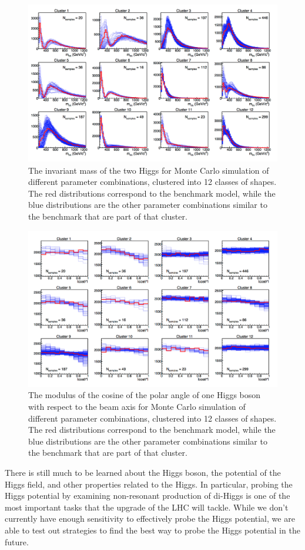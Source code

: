 \begin{figure}[h]
\centering
\includegraphics[scale=0.4]{F2/MHHClusters.png}
\caption{The invariant mass of the two Higgs for Monte Carlo simulation of different parameter combinations, clustered into 12 classes of shapes. The red distributions correspond to the benchmark model, while the blue distributions are the other parameter combinations similar to the benchmark that are part of that cluster.}
\label{Fig:MHHClusters}
\end{figure}

\begin{figure}[h]
\centering
\includegraphics[scale=0.4]{F2/CosClusters.png}
\caption{The modulus of the cosine of the polar angle of one Higgs boson with respect to the beam axis for Monte Carlo simulation of different parameter combinations, clustered into 12 classes of shapes. The red distributions correspond to the benchmark model, while the blue distributions are the other parameter combinations similar to the benchmark that are part of that cluster.}
\label{Fig:CosClusters}
\end{figure}

There is still much to be learned about the Higgs boson, the potential of the Higgs field, and other properties related to the Higgs. In particular, probing the Higgs potential by examining non-resonant production of di-Higgs is one of the most important tasks that the upgrade of the LHC will tackle. While we don't currently have enough sensitivity to effectively probe the Higgs potential, we are able to test out strategies to find the best way to probe the Higgs potential in the future. 